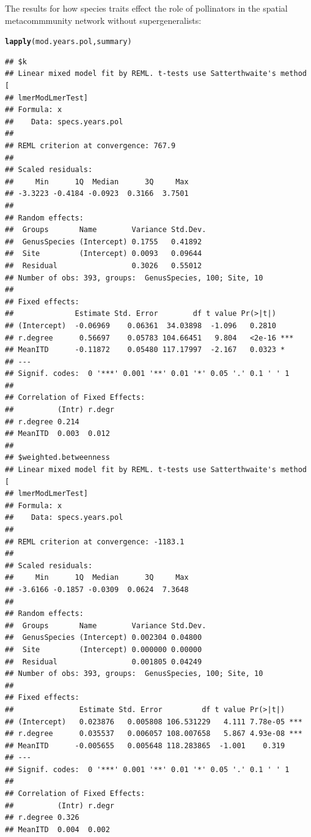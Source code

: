\documentclass{article}\usepackage[]{graphicx}\usepackage[]{color}
\makeatletter
\newcommand{\hlstd}[1]{\textcolor[rgb]{0.345,0.345,0.345}{#1}}%
\newcommand{\hlkwd}[1]{\textcolor[rgb]{0.737,0.353,0.396}{\textbf{#1}}}%
\newenvironment{kframe}{%
 \def\at@end@of@kframe{}%
 \ifinner\ifhmode%
  \def\at@end@of@kframe{\end{minipage}}%
  \begin{minipage}{\columnwidth}%
 \fi\fi%
 \def\FrameCommand##1{\hskip\@totalleftmargin \hskip-\fboxsep
 \colorbox{shadecolor}{##1}\hskip-\fboxsep
     \hskip-\linewidth \hskip-\@totalleftmargin \hskip\columnwidth}%
 \MakeFramed {\advance\hsize-\width
   \@totalleftmargin\z@ \linewidth\hsize
   \@setminipage}}%
 {\par\unskip\endMakeFramed%
 \at@end@of@kframe}
\newenvironment{knitrout}{}{} %
\makeatother
\begin{document}
The results for how species traits effect the role of pollinators in
the spatial metacommmunity network without supergeneralists: 
\begin{knitrout}
\color{fgcolor}\begin{kframe}
\begin{alltt}
\hlkwd{lapply}\hlstd{(mod.years.pol, summary)}
\end{alltt}
\begin{verbatim}
## $k
## Linear mixed model fit by REML. t-tests use Satterthwaite's method [
## lmerModLmerTest]
## Formula: x
##    Data: specs.years.pol
## 
## REML criterion at convergence: 767.9
## 
## Scaled residuals: 
##     Min      1Q  Median      3Q     Max 
## -3.3223 -0.4184 -0.0923  0.3166  3.7501 
## 
## Random effects:
##  Groups       Name        Variance Std.Dev.
##  GenusSpecies (Intercept) 0.1755   0.41892 
##  Site         (Intercept) 0.0093   0.09644 
##  Residual                 0.3026   0.55012 
## Number of obs: 393, groups:  GenusSpecies, 100; Site, 10
## 
## Fixed effects:
##              Estimate Std. Error        df t value Pr(>|t|)    
## (Intercept)  -0.06969    0.06361  34.03898  -1.096   0.2810    
## r.degree      0.56697    0.05783 104.66451   9.804   <2e-16 ***
## MeanITD      -0.11872    0.05480 117.17997  -2.167   0.0323 *  
## ---
## Signif. codes:  0 '***' 0.001 '**' 0.01 '*' 0.05 '.' 0.1 ' ' 1
## 
## Correlation of Fixed Effects:
##          (Intr) r.degr
## r.degree 0.214        
## MeanITD  0.003  0.012 
## 
## $weighted.betweenness
## Linear mixed model fit by REML. t-tests use Satterthwaite's method [
## lmerModLmerTest]
## Formula: x
##    Data: specs.years.pol
## 
## REML criterion at convergence: -1183.1
## 
## Scaled residuals: 
##     Min      1Q  Median      3Q     Max 
## -3.6166 -0.1857 -0.0309  0.0624  7.3648 
## 
## Random effects:
##  Groups       Name        Variance Std.Dev.
##  GenusSpecies (Intercept) 0.002304 0.04800 
##  Site         (Intercept) 0.000000 0.00000 
##  Residual                 0.001805 0.04249 
## Number of obs: 393, groups:  GenusSpecies, 100; Site, 10
## 
## Fixed effects:
##               Estimate Std. Error         df t value Pr(>|t|)    
## (Intercept)   0.023876   0.005808 106.531229   4.111 7.78e-05 ***
## r.degree      0.035537   0.006057 108.007658   5.867 4.93e-08 ***
## MeanITD      -0.005655   0.005648 118.283865  -1.001    0.319    
## ---
## Signif. codes:  0 '***' 0.001 '**' 0.01 '*' 0.05 '.' 0.1 ' ' 1
## 
## Correlation of Fixed Effects:
##          (Intr) r.degr
## r.degree 0.326        
## MeanITD  0.004  0.002
\end{verbatim}
\end{kframe}
\end{knitrout}
\end{document}
